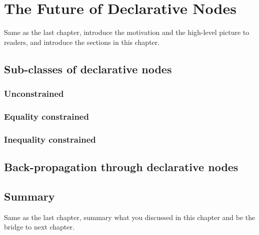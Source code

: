 \chapter{The Future of Declarative Nodes}
\label{cha:futurepart1}
Same as the last chapter, introduce the motivation and the high-level picture to
readers, and introduce the sections in this chapter.


\section{Sub-classes of declarative nodes}
\label{sec:des-hotpath}


\subsection{Unconstrained}

\subsection{Equality constrained}

\subsection{Inequality constrained}

\section{Back-propagation through declarative nodes}

\section{Summary}
Same as the last chapter, summary what you discussed in this chapter and
be the bridge to next chapter.